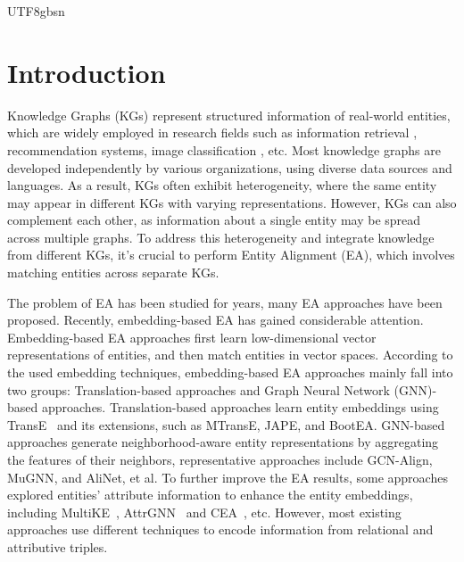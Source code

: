 \documentclass[preprint,12pt]{elsarticle}
\begin{document}
\begin{CJK}{UTF8}{gbsn}
\begin{frontmatter}
\end{frontmatter}


\section{Introduction}
\label{sec:INTRODUCTION}
Knowledge Graphs (KGs) represent structured information of real-world entities, which are widely employed in research fields such as information retrieval \cite{peng2023knowledge,reinanda2020knowledge}, recommendation systems\cite{balloccu2022post,sun2020multi}, image classification \cite{raisi2020selecting,pan2022contrastive}, etc. Most knowledge graphs are developed independently by various organizations, using diverse data sources and languages. As a result, KGs often exhibit heterogeneity, where the same entity may appear in different KGs with varying representations. However, KGs can also complement each other, as information about a single entity may be spread across multiple graphs. To address this heterogeneity and integrate knowledge from different KGs, it's crucial to perform Entity Alignment (EA), which involves matching entities across separate KGs.

The problem of EA has been studied for years, many EA approaches have been proposed. Recently, embedding-based EA has gained considerable attention. Embedding-based EA approaches first learn low-dimensional vector representations of entities, and then match entities in vector spaces. According to the used embedding techniques, embedding-based EA approaches mainly fall into two groups: Translation-based approaches and Graph Neural Network (GNN)-based approaches. Translation-based approaches learn entity embeddings using TransE~\cite{bordes2013translating} and its extensions, such as MTransE\cite{mtranse}, JAPE\cite{jape}, and BootEA\cite{bootea}. GNN-based approaches generate neighborhood-aware entity representations by aggregating the features of their neighbors, representative approaches include GCN-Align\cite{gcnalign}, MuGNN\cite{mugnn}, and AliNet\cite{AliNet}, et al. To further improve the EA results, some approaches explored entities’ attribute information to enhance the entity embeddings, including MultiKE~\cite{multike}, AttrGNN~\cite{AttrGNN} and CEA~\cite{cea}, etc. However, most existing approaches use different techniques to encode information from relational and attributive triples.


\end{CJK}
\end{document}
